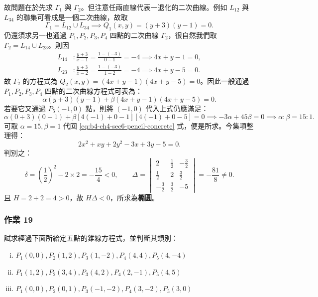 \begin{solution}
故問題在於先求 $\Gamma_1$ 與 $\Gamma_2$。但注意任兩直線代表一退化的二次曲線。例如 $L_{12}$ 與 $L_{34}$ 的聯集可看成是一個二次曲線，故取
\[
\Gamma_1 = L_{12} \cup L_{34} \implies Q_1(x, y) = (y + 3)(y - 1) = 0.
\]
仍還須求另一也通過 $P_1, P_2, P_3, P_4$ 四點的二次曲線 $\Gamma_2$，很自然我們取 $\Gamma_2 = L_{14} \cup L_{23}$。則因
\[
\begin{aligned}
L_{14}&: \frac{y + 3}{x - 1} = \frac{1 - (-3)}{0 - 1} = -4 \implies 4x + y - 1 = 0, \\
L_{23}&: \frac{y + 3}{x - 2} = \frac{1 - (-3)}{1 - 2} = -4 \implies 4x + y - 5 = 0.
\end{aligned}
\]
故 $\Gamma_2$ 的方程式為 $Q_2(x, y) = (4x + y - 1)(4x + y - 5) = 0$。因此一般通過 $P_1, P_2, P_3, P_4$ 四點的二次曲線方程式可表為：
\begin{equation}
\alpha (y + 3)(y - 1) + \beta (4x + y - 1)(4x + y - 5) = 0.
\label{eq:b4-ch4-sec6-pencil-concrete}
\end{equation}
若要它又通過 $P_5(-1, 0)$ 點，則將 $(-1, 0)$ 代入上式仍應滿足：
\[
\alpha(0 + 3)(0 - 1) + \beta[4(-1) + 0 - 1][4(-1) + 0 - 5] = 0 \implies -3\alpha + 45\beta = 0 \implies \alpha : \beta = 15 : 1.
\]
可取 $\alpha = 15, \beta = 1$ 代回 \eqref{eq:b4-ch4-sec6-pencil-concrete} 式，便是所求。今集項整理得：
\[
2x^2 + xy + 2y^2 - 3x + 3y - 5 = 0.
\]
判別之：
\[
\delta = \left(\frac{1}{2}\right)^2 - 2 \times 2 = -\frac{15}{4} < 0, \qquad
\Delta = \begin{vmatrix} 2 & \frac{1}{2} & -\frac{3}{2} \\ \frac{1}{2} & 2 & \frac{3}{2} \\ -\frac{3}{2} & \frac{3}{2} & -5 \end{vmatrix} = -\frac{81}{8} \ne 0.
\]
且 $H = 2 + 2 = 4 > 0$，故 $H\Delta < 0$，所求為\textbf{橢圓}。
\end{solution}

\subsubsection*{作業 19}
試求經過下面所給定五點的錐線方程式，並判斷其類別：
\begin{enumerate}[(i)]
  \item $P_1(0, 0), P_2(1, 2), P_3(1, -2), P_4(4, 4), P_5(4, -4)$
  \item $P_1(1, 2), P_2(3, 4), P_3(4, 2), P_4(2, -1), P_5(4, 5)$
  \item $P_1(0, 0), P_2(0, 1), P_3(-1, -2), P_4(3, -2), P_5(3, 0)$
\end{enumerate}

